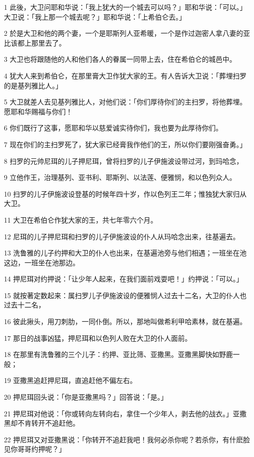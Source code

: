\par 1 此後，大卫问耶和华说：「我上犹大的一个城去可以吗？」耶和华说：「可以。」大卫说：「我上那一个城去呢？」耶和华说：「上希伯仑去。」
\par 2 於是大卫和他的两个妻，一个是耶斯列人亚希暖，一个是作过迦密人拿八妻的亚比该都上那里去了。
\par 3 大卫也将跟随他的人和他们各人的眷属一同带上去，住在希伯仑的城邑中。
\par 4 犹大人来到希伯仑，在那里膏大卫作犹大家的王。有人告诉大卫说：「葬埋扫罗的是基列雅比人。」
\par 5 大卫就差人去见基列雅比人，对他们说：「你们厚待你们的主扫罗，将他葬埋。愿耶和华赐福与你们！
\par 6 你们既行了这事，愿耶和华以慈爱诚实待你们，我也要为此厚待你们。
\par 7 现在你们的主扫罗死了，犹大家已经膏我作他们的王，所以你们要刚强奋勇。」
\par 8 扫罗的元帅尼珥的儿子押尼珥，曾将扫罗的儿子伊施波设带过河，到玛哈念，
\par 9 立他作王，治理基列、亚书利、耶斯列、以法莲、便雅悯，和以色列众人。
\par 10 扫罗的儿子伊施波设登基的时候年四十岁，作以色列王二年；惟独犹大家归从大卫。
\par 11 大卫在希伯仑作犹大家的王，共七年零六个月。
\par 12 尼珥的儿子押尼珥和扫罗的儿子伊施波设的仆人从玛哈念出来，往基遍去。
\par 13 洗鲁雅的儿子约押和大卫的仆人也出来，在基遍池旁与他们相遇；一班坐在池这边，一班坐在池那边。
\par 14 押尼珥对约押说：「让少年人起来，在我们面前戏耍吧！」约押说：「可以。」
\par 15 就按著定数起来：属扫罗儿子伊施波设的便雅悯人过去十二名，大卫的仆人也过去十二名，
\par 16 彼此揪头，用刀刺肋，一同仆倒。所以，那地叫做希利甲哈素林，就在基遍。
\par 17 那日的战事凶猛，押尼珥和以色列人败在大卫的仆人面前。
\par 18 在那里有洗鲁雅的三个儿子：约押、亚比筛、亚撒黑。亚撒黑脚快如野鹿一般；
\par 19 亚撒黑追赶押尼珥，直追赶他不偏左右。
\par 20 押尼珥回头说：「你是亚撒黑吗？」回答说：「是。」
\par 21 押尼珥对他说：「你或转向左转向右，拿住一个少年人，剥去他的战衣。」亚撒黑却不肯转开不追赶他。
\par 22 押尼珥又对亚撒黑说：「你转开不追赶我吧！我何必杀你呢？若杀你，有什麽脸见你哥哥约押呢？」
